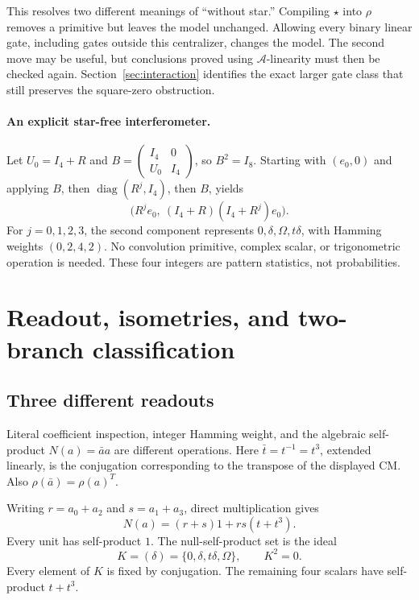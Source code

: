 \documentclass[11pt,a4paper]{article}
\theoremstyle{definition}\newtheorem{definition}[theorem]{Definition}
\theoremstyle{remark}\newtheorem{remark}[theorem]{Remark}
\newcommand{\A}{\mathcal A}
\newcommand{\diag}{\operatorname{diag}}
\numberwithin{equation}{section}
\begin{document}
This resolves two different meanings of ``without star.'' Compiling $\star$ into $\rho$ removes a primitive but leaves the model unchanged. Allowing every binary linear gate, including gates outside this centralizer, changes the model. The second move may be useful, but conclusions proved using $\A$-linearity must then be checked again. Section~\ref{sec:interaction} identifies the exact larger gate class that still preserves the square-zero obstruction.

\paragraph{An explicit star-free interferometer.}
Let $U_0=I_4+R$ and $B=\left(\begin{smallmatrix}I_4&0\\U_0&I_4\end{smallmatrix}\right)$, so $B^2=I_8$. Starting with $(e_0,0)$ and applying $B$, then $\diag(R^j,I_4)$, then $B$, yields
\begin{equation}\label{eq:fringe}
 \big(R^je_0,\ (I_4+R)(I_4+R^j)e_0\big).
\end{equation}
For $j=0,1,2,3$, the second component represents $0,\delta,\Omega,t\delta$, with Hamming weights $(0,2,4,2)$. No convolution primitive, complex scalar, or trigonometric operation is needed. These four integers are pattern statistics, not probabilities.

\section{Readout, isometries, and two-branch classification}\label{sec:readout}
\subsection{Three different readouts}
Literal coefficient inspection, integer Hamming weight, and the algebraic self-product $N(a)=\bar a a$ are different operations. Here $\bar t=t^{-1}=t^3$, extended linearly, is the conjugation corresponding to the transpose of the displayed CM. Also $\rho(\bar a)=\rho(a)^T$.

Writing $r=a_0+a_2$ and $s=a_1+a_3$, direct multiplication gives
\begin{equation}\label{eq:norm}
 N(a)=(r+s)1+rs(t+t^3).
\end{equation}
Every unit has self-product $1$. The null-self-product set is the ideal
\[
 K=(\delta)=\{0,\delta,t\delta,\Omega\},\qquad K^2=0.
\]
Every element of $K$ is fixed by conjugation. The remaining four scalars have self-product $t+t^3$.
\end{document}
